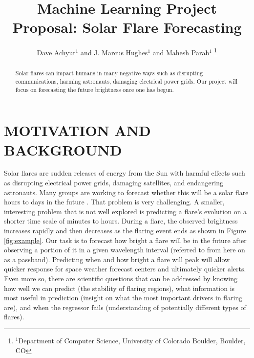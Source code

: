 \documentclass[letterpaper, 10 pt, onecolumn]{ieeeconf}
\title{\LARGE \bf Machine Learning Project Proposal: Solar Flare Forecasting}
\author{Dave Achyut$^{1}$ and J. Marcus Hughes$^{1}$ and Mahesh Parab$^{1}$%
\thanks{$^{1}$Department of Computer Science, University of Colorado Boulder, Boulder, CO}%
}
\begin{document}
\maketitle
\thispagestyle{empty}
\pagestyle{empty}

\begin{abstract}
Solar flares can impact humans in many negative ways such as disrupting communications, harming astronauts, damaging electrical power grids. Our project will focus on forecasting the future brightness once one has begun. 

\end{abstract}

\section{MOTIVATION AND BACKGROUND}
Solar flares are sudden releases of energy from the Sun with harmful effects such as disrupting electrical power grids, damaging satellites, and endangering astronauts. Many groups are working to forecast whether this will be a solar flare hours to days in the future \cite{nishizuka}. That problem is very challenging. A smaller, interesting problem that is not well explored is predicting a flare's evolution on a shorter time scale of minutes to hours. During a flare, the observed brightness increases rapidly and then decreases as the flaring event ends as shown in Figure \ref{fig:example}. Our task is to forecast how bright a flare will be in the future after observing a portion of it in a given wavelength interval (referred to from here on as a passband). Predicting when and how bright a flare will peak will allow quicker response for space weather forecast centers and ultimately quicker alerts. Even more so, there are scientific questions that can be addressed by knowing how well we can predict (the stability of flaring regions), what information is most useful in prediction (insight on what the most important drivers in flaring are), and when the regressor fails (understanding of potentially different types of flares).
\end{document}
